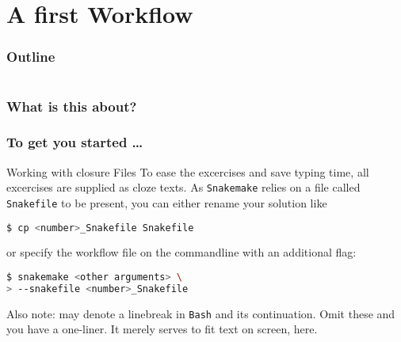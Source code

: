 \section{A first Workflow}

\begin{frame}
    \frametitle{Outline}
    \begin{columns}[t]
        \begin{column}{.5\textwidth}
            \tableofcontents[sections={1-9},currentsection]
        \end{column}
        \begin{column}{.5\textwidth}
            \tableofcontents[sections={10-18},currentsection]
        \end{column}
    \end{columns}
\end{frame}

\begin{frame}
  \frametitle{What is this about?}
\end{frame}

\begin{frame}[fragile]
  \frametitle{To get you started \ldots}
  \begin{exampleblock}{Working with closure Files}
    To ease the excercises and save typing time, all excercises are supplied as cloze texts.\linebreak
    As \texttt{Snakemake} relies on a file called \texttt{Snakefile} to be present, you can either rename your solution like
    \begin{lstlisting}[language=Bash, style=Shell]
$ cp <number>_Snakefile Snakefile
    \end{lstlisting}
    or specify the workflow file on the commandline with an additional flag:
    \begin{lstlisting}[language=Bash, style=Shell]
$ snakemake <other arguments> \
> --snakefile <number>_Snakefile
    \end{lstlisting}
    Also note: \altverb{\\} may denote a linebreak in \texttt{Bash} and \altverb{>} its continuation. Omit these and you have a one-liner. It merely serves to fit text on screen, here.
  \end{exampleblock}
\end{frame}


